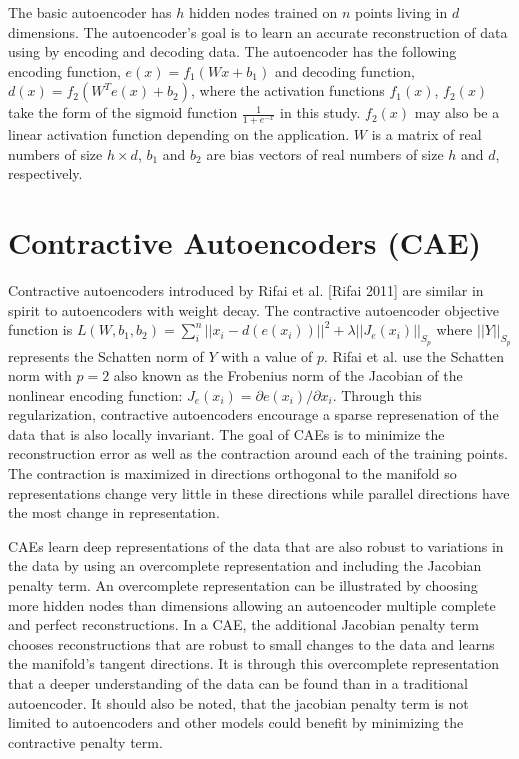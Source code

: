 \documentclass{article} %
\begin{document}
The basic autoencoder has $h$ hidden nodes trained on $n$ points living in $d$ dimensions. The autoencoder's goal is to learn an accurate reconstruction of data using by encoding and decoding data. The autoencoder has the following encoding function, $e(x) = f_1(Wx + b_1) $ and decoding function, $d(x) = f_2(W^{T} e(x) + b_2) $, where the activation functions $f_1(x)$, $f_2(x)$ take the form of the sigmoid function $\frac{1}{1 + e^{-x}}$ in this study. $f_2(x)$ may also be a linear activation function depending on the application. $W$ is a matrix of real numbers of size $h \times d$, $b_1$ and $b_2$ are bias vectors of real numbers of size $h$ and $d$, respectively.

\section{Contractive Autoencoders (CAE)}

Contractive autoencoders introduced by Rifai et al. [Rifai 2011] are similar in spirit to autoencoders with weight decay. The contractive autoencoder objective function is $L(W, b_1, b_2) = \sum^n_i{ || x_i - d(e(x_i)) ||^2 } + \lambda || J_e (x_i) ||_{S_p} $ where $|| Y ||_{S_p}$ represents the Schatten norm of $Y$ with a value of $p$. Rifai et al. use the Schatten norm with $p=2$ also known as the Frobenius norm of the Jacobian of the nonlinear encoding function: $ J_{e}(x_i) = \partial e(x_i) / \partial x_i$. Through this regularization, contractive autoencoders encourage a sparse represenation of the data that is also locally invariant. The goal of CAEs is to minimize the reconstruction error as well as the contraction around each of the training points. The contraction is maximized in directions orthogonal to the manifold so representations change very little in these directions while parallel directions have the most change in representation. 

CAEs learn deep representations of the data that are also robust to variations in the data by using an overcomplete representation and including the Jacobian penalty term. An overcomplete representation can be illustrated by choosing more hidden nodes than dimensions allowing an autoencoder multiple complete and perfect reconstructions. In a CAE, the additional Jacobian penalty term chooses reconstructions that are robust to small changes to the data and learns the manifold's tangent directions. It is through this overcomplete representation that a deeper understanding of the data can be found than in a traditional autoencoder. It should also be noted, that the jacobian penalty term is not limited to autoencoders and other models could benefit by minimizing the contractive penalty term.
\end{document}
